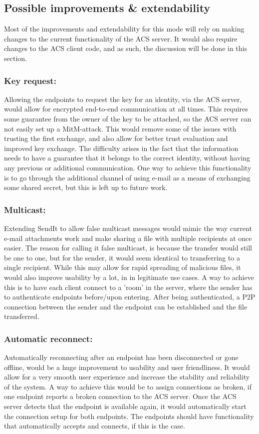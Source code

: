 \subsection{Possible improvements \& extendability}
%
Most of the improvements and extendability for this mode will rely on making changes to the current functionality of the ACS server. It would also require changes to the ACS client code, and as such, the discussion will be done in this section.

\subsubsection*{Key request:}
Allowing the endpoints to request the key for an identity, via the ACS server, would allow for encrypted end-to-end communication at all times. This requires some guarantee from the owner of the key to be attached, so the ACS server can not easily set up a MitM-attack. This would remove some of the issues with trusting the first exchange, and also allow for better trust evaluation and improved key exchange. The difficulty arises in the fact that the information needs to have a guarantee that it belongs to the correct identity, without having any previous or additional communication. One way to achieve this functionality is to go through the additional channel of using e-mail as a means of exchanging some shared secret, but this is left up to future work.
%
\subsubsection*{Multicast:}
Extending SendIt to allow false multicast messages would mimic the way current e-mail attachments work and make sharing a file with multiple recipients at once easier. The reason for calling it false multicast, is because the transfer would still be one to one, but for the sender, it would seem identical to transferring to a single recipient. While this may allow for rapid spreading of malicious files, it would also improve usability by a lot, in in legitimate use cases. A way to achieve this is to have each client connect to a 'room' in the server, where the sender has to authenticate endpoints before/upon entering. After being authenticated, a P2P connection between the sender and the endpoint can be established and the file transferred.
%
\subsubsection*{Automatic reconnect:}
Automatically reconnecting after an endpoint has been disconnected or gone offline, would be a huge improvement to usability and user friendliness. It would allow for a very smooth user experience and increase the stability and reliability of the system. A way to achieve this would be to assign connections as broken, if one endpoint reports a broken connection to the ACS server. Once the ACS server detects that the endpoint is available again, it would automatically start the connection setup for both endpoints. The endpoints should have functionality that automatically accepts and connects, if this is the case.
%
